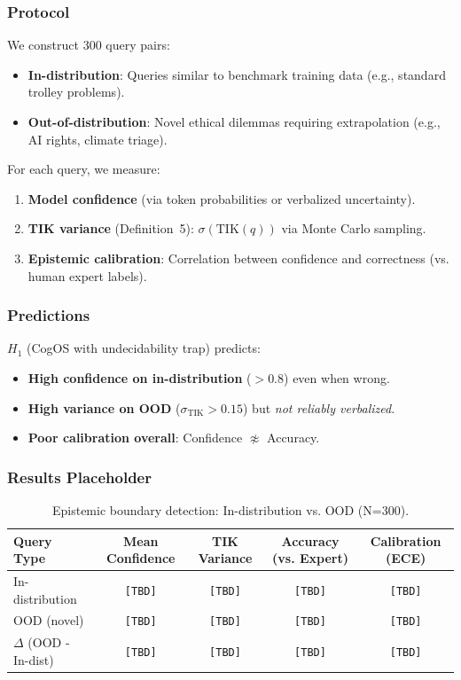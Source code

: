 \documentclass[11pt]{article}
\begin{document}
\subsubsection{Protocol}

We construct 300 query pairs:
\begin{itemize}
    \item \textbf{In-distribution}: Queries similar to benchmark training data (e.g., standard trolley problems).
    \item \textbf{Out-of-distribution}: Novel ethical dilemmas requiring extrapolation (e.g., AI rights, climate triage).
\end{itemize}

For each query, we measure:
\begin{enumerate}
    \item \textbf{Model confidence} (via token probabilities or verbalized uncertainty).
    \item \textbf{TIK variance} (Definition~5): $\sigma(\text{TIK}(q))$ via Monte Carlo sampling.
    \item \textbf{Epistemic calibration}: Correlation between confidence and correctness (vs. human expert labels).
\end{enumerate}

\subsubsection{Predictions}

$H_1$ (CogOS with undecidability trap) predicts:
\begin{itemize}
    \item \textbf{High confidence on in-distribution} ($> 0.8$) even when wrong.
    \item \textbf{High variance on OOD} ($\sigma_{\text{TIK}} > 0.15$) but \emph{not reliably verbalized}.
    \item \textbf{Poor calibration overall}: Confidence $\not\approx$ Accuracy.
\end{itemize}

\subsubsection{Results Placeholder}

\begin{table}[h]
\centering
\caption{Epistemic boundary detection: In-distribution vs. OOD (N=300).}
\label{tab:epistemic-results}
\begin{tabular}{lcccc}
\toprule
Query Type & Mean Confidence & TIK Variance & Accuracy (vs. Expert) & Calibration (ECE) \\
\midrule
In-distribution & \texttt{[TBD]} & \texttt{[TBD]} & \texttt{[TBD]} & \texttt{[TBD]} \\
OOD (novel) & \texttt{[TBD]} & \texttt{[TBD]} & \texttt{[TBD]} & \texttt{[TBD]} \\
\midrule
$\Delta$ (OOD - In-dist) & \texttt{[TBD]} & \texttt{[TBD]} & \texttt{[TBD]} & \texttt{[TBD]} \\
\bottomrule
\end{tabular}
\end{table}
\end{document}
